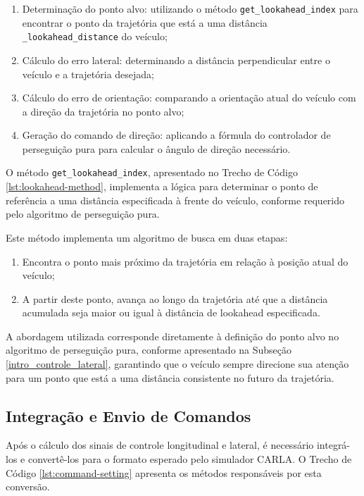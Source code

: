 \begin{enumerate}
    \item Determinação do ponto alvo: utilizando o método \texttt{get\_lookahead\_index} para encontrar o ponto da trajetória que está a uma distância \texttt{\_lookahead\_distance} do veículo;
    
    \item Cálculo do erro lateral: determinando a distância perpendicular entre o veículo e a trajetória desejada;
    
    \item Cálculo do erro de orientação: comparando a orientação atual do veículo com a direção da trajetória no ponto alvo;
    
    \item Geração do comando de direção: aplicando a fórmula do controlador de perseguição pura para calcular o ângulo de direção necessário.
\end{enumerate}

O método \texttt{get\_lookahead\_index}, apresentado no Trecho de Código \ref{lst:lookahead-method}, implementa a lógica para determinar o ponto de referência a uma distância especificada à frente do veículo, conforme requerido pelo algoritmo de perseguição pura.

Este método implementa um algoritmo de busca em duas etapas:

\begin{enumerate}
    \item Encontra o ponto mais próximo da trajetória em relação à posição atual do veículo;
    \item A partir deste ponto, avança ao longo da trajetória até que a distância acumulada seja maior ou igual à distância de lookahead especificada.
\end{enumerate}

A abordagem utilizada corresponde diretamente à definição do ponto alvo no algoritmo de perseguição pura, conforme apresentado na Subseção \ref{intro_controle_lateral}, garantindo que o veículo sempre direcione sua atenção para um ponto que está a uma distância consistente no futuro da trajetória.

\subsection{Integração e Envio de Comandos}

Após o cálculo dos sinais de controle longitudinal e lateral, é necessário integrá-los e convertê-los para o formato esperado pelo simulador CARLA. O Trecho de Código \ref{lst:command-setting} apresenta os métodos responsáveis por esta conversão.

